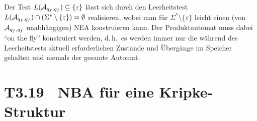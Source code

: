 \documentclass[fontsize=11pt, twoside=false, numbers=autoenddot]{scrbook}
\begin{document}
\par\medskip\noindent
Der Test $L(\mathcal{A}_{q_f,q_f}) \subseteq \{\varepsilon\}$ lässt sich durch den Leerheitstest
$L(\mathcal{A}_{q_f,q_f}) \cap (\Sigma^* \setminus \{\varepsilon\}) = \emptyset$
realisieren,
wobei man für $\Sigma^* \setminus \{\varepsilon\}$ leicht einen (von $\mathcal{A}_{q_f,q_f}$ unabhängigen)
NEA konstru\-ieren kann. Der Produktautomat muss dabei "`on the fly"' konstruiert werden,
d.\,h.\ es werden immer nur die während des Leerheitstests aktuell erforderlichen Zustände und Übergänge
im Speicher gehalten und niemals der gesamte Automat.

\section*{T3.19~ NBA für eine Kripke-Struktur}
\end{document}
